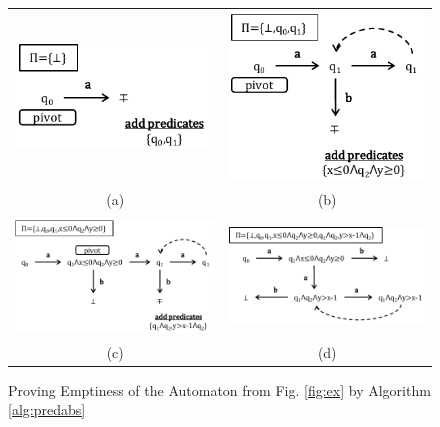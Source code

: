 \documentclass[10pt,conference,letterpaper,twocolumn]{IEEEtran}
\begin{document}
\begin{figure}[t!]
\begin{tabular}{cc}
\includegraphics[scale=0.5]{figures/PA1.pdf} & \includegraphics[scale=0.5]{figures/PA2.pdf} \\[-2mm]
\tiny{(a)} & \tiny{(b)} \\
\\
\includegraphics[scale=0.5]{figures/PA3.pdf} & \includegraphics[scale=0.5]{figures/PA4.pdf} \\[-2mm]
\tiny{(c)} & \tiny{(d)}
\end{tabular}
\vspace*{-\baselineskip}
\caption{Proving Emptiness of the Automaton from Fig. \ref{fig:ex} by Algorithm \ref{alg:predabs}}
\label{fig:pa}
\end{figure}
\end{document}
